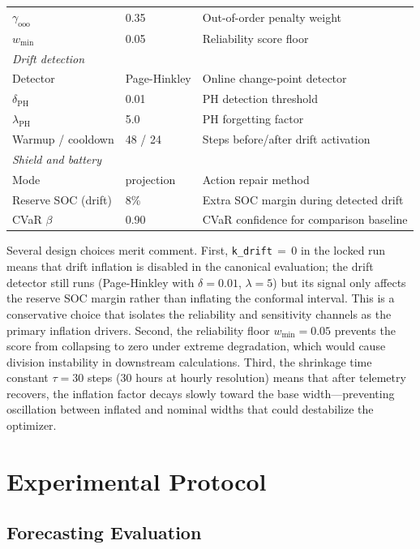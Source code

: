 \documentclass[11pt,a4paper]{article}
\begin{document}
\begin{table}[htbp]
\begin{tabular}{p{3.8cm}p{1.5cm}p{7.2cm}}
\quad $\gamma_{\text{ooo}}$ & 0.35 & Out-of-order penalty weight \\
\quad $w_{\min}$ & 0.05 & Reliability score floor \\
\midrule
\multicolumn{3}{l}{\textit{Drift detection}} \\
\quad Detector & Page-Hinkley & Online change-point detector \\
\quad $\delta_{\text{PH}}$ & 0.01 & PH detection threshold \\
\quad $\lambda_{\text{PH}}$ & 5.0 & PH forgetting factor \\
\quad Warmup / cooldown & 48 / 24 & Steps before/after drift activation \\
\midrule
\multicolumn{3}{l}{\textit{Shield and battery}} \\
\quad Mode & projection & Action repair method \\
\quad Reserve SOC (drift) & 8\% & Extra SOC margin during detected drift \\
\quad CVaR $\beta$ & 0.90 & CVaR confidence for comparison baseline \\
\bottomrule
\end{tabular}
\end{table}

Several design choices merit comment.  First, \texttt{k\_drift}$\,=\,0$ in the locked run means that drift inflation is disabled in the canonical evaluation; the drift detector still runs (Page-Hinkley with $\delta=0.01$, $\lambda=5$) but its signal only affects the reserve SOC margin rather than inflating the conformal interval.  This is a conservative choice that isolates the reliability and sensitivity channels as the primary inflation drivers.  Second, the reliability floor $w_{\min}=0.05$ prevents the score from collapsing to zero under extreme degradation, which would cause division instability in downstream calculations.  Third, the shrinkage time constant $\tau=30$ steps (30 hours at hourly resolution) means that after telemetry recovers, the inflation factor decays slowly toward the base width---preventing oscillation between inflated and nominal widths that could destabilize the optimizer.

\section{Experimental Protocol}\label{sec:experiments}

\subsection{Forecasting Evaluation}
\end{document}
